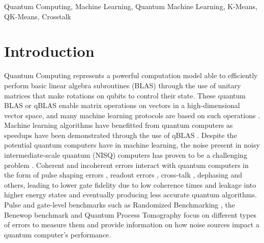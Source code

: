 \documentclass[conference]{IEEEtran}
\begin{document}
\begin{IEEEkeywords}
Quantum Computing, Machine Learning, Quantum Machine Learning, K-Means, QK-Means, Crosstalk
\end{IEEEkeywords}

\section{Introduction}
Quantum Computing represents a powerful computation model able to efficiently perform basic linear algebra subroutines (BLAS) through the use of unitary matrices that make rotations on qubits to control their state. These quantum BLAS or qBLAS enable matrix operations on vectors in a high-dimensional vector space, and many machine learning protocols are based on such operations \cite{Biamonte2017}. Machine learning algorithms have benefitted from quantum computers as speedups have been demonstrated through the use of qBLAS \cite{PhysRevLett.103.150502}\cite{PhysRevLett.109.050505}\cite{Childs_2017}. Despite the potential quantum computers have in machine learning, the noise present in noisy intermediate-scale quantum (NISQ) computers has proven to be a challenging problem \cite{Preskill2018quantumcomputingin}. Coherent and incoherent errors \cite{Feng_2016} interact with quantum computers in the form of pulse shaping errors \cite{PhysRevResearch.2.043418}, readout errors \cite{Nachman2020}, cross-talk \cite{10.1145/3373376.3378477}\cite{8614500}\cite{Sarovar2020detectingcrosstalk}, dephasing \cite{HU_2002} and others, leading to lower gate fidelity due to low coherence times and leakage into higher energy states \cite{werninghaus2020leakage}\cite{PhysRevA.93.060302}\cite{Chasseur_2015} and eventually producing less accurate quantum algorithms. Pulse and gate-level benchmarks such as Randomized Benchmarking \cite{Knill_2008}, the Benewop benchmark \cite{PhysRevA.101.042308} and Quantum Process Tomography \cite{10.5555/1972505} focus on different types of errors to measure them and provide information on how noise sources impact a quantum computer's performance.
\end{document}
